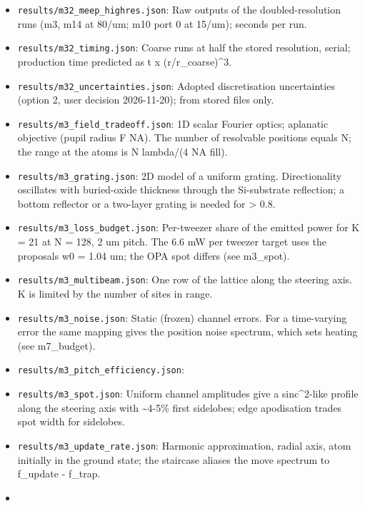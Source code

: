 \begin{itemize}
  result; high = doubled resolution (m10: low = new 15/um run, high =
  stored 30/um). FAIL rows are findings; no stored result or report
  number was changed.
\item
  \texttt{results/m32\_meep\_highres.json}: Raw outputs of the
  doubled-resolution runs (m3, m14 at 80/um; m10 port 0 at 15/um);
  seconds per run.
\item
  \texttt{results/m32\_timing.json}: Coarse runs at half the stored
  resolution, serial; production time predicted as t x
  (r/r\_coarse)\^{}3.
\item
  \texttt{results/m32\_uncertainties.json}: Adopted discretisation
  uncertainties (option 2, user decision 2026-11-20); from stored files
  only.
\item
  \texttt{results/m3\_field\_tradeoff.json}: 1D scalar Fourier optics;
  aplanatic objective (pupil radius F NA). The number of resolvable
  positions equals N; the range at the atoms is N lambda/(4 NA fill).
\item
  \texttt{results/m3\_grating.json}: 2D model of a uniform grating.
  Directionality oscillates with buried-oxide thickness through the
  Si-substrate reflection; a bottom reflector or a two-layer grating is
  needed for \textgreater{} 0.8.
\item
  \texttt{results/m3\_loss\_budget.json}: Per-tweezer share of the
  emitted power for K = 21 at N = 128, 2 um pitch. The 6.6 mW per
  tweezer target uses the proposal\textquotesingle s w0 = 1.04 um; the
  OPA spot differs (see m3\_spot).
\item
  \texttt{results/m3\_multibeam.json}: One row of the lattice along the
  steering axis. K is limited by the number of sites in range.
\item
  \texttt{results/m3\_noise.json}: Static (frozen) channel errors. For a
  time-varying error the same mapping gives the position noise spectrum,
  which sets heating (see m7\_budget).
\item
  \texttt{results/m3\_pitch\_efficiency.json}:
\item
  \texttt{results/m3\_spot.json}: Uniform channel amplitudes give a
  sinc\^{}2-like profile along the steering axis with
  \textasciitilde4-5\% first sidelobes; edge apodisation trades spot
  width for sidelobes.
\item
  \texttt{results/m3\_update\_rate.json}: Harmonic approximation, radial
  axis, atom initially in the ground state; the staircase aliases the
  move spectrum to \textbar f\_update - f\_trap\textbar.
\item

\end{itemize}
